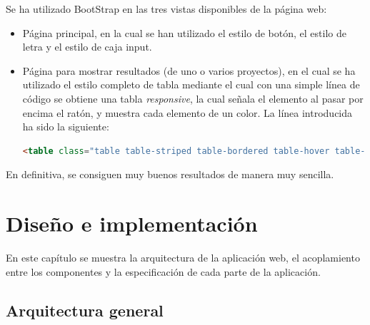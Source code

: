 \documentclass[a4paper, 12pt]{book}
\begin{document}
Se ha utilizado BootStrap en las tres vistas disponibles de la página web:
\begin{itemize}
  \item Página principal, en la cual se han utilizado el estilo de botón, el estilo de letra y el estilo de caja input.
  \item Página para mostrar resultados (de uno o varios proyectos), en el cual se ha utilizado el estilo completo de tabla mediante el cual con una simple línea de código se obtiene una tabla \emph{responsive}, la cual señala el elemento al pasar por encima el ratón, y muestra cada elemento de un color. La línea introducida ha sido la siguiente:
  \begin{lstlisting}[basicstyle=\small, language=HTML, breaklines=true]
    <table class="table table-striped table-bordered table-hover table-condensed">
  \end{lstlisting}
\end{itemize}

En definitiva, se consiguen muy buenos resultados de manera muy sencilla.


\cleardoublepage
\chapter{Diseño e implementación}

En este capítulo se muestra la arquitectura de la aplicación web,
el acoplamiento entre los componentes y la especificación de cada parte de la aplicación.

\section{Arquitectura general}
\label{sec:arquitectura}
\end{document}
